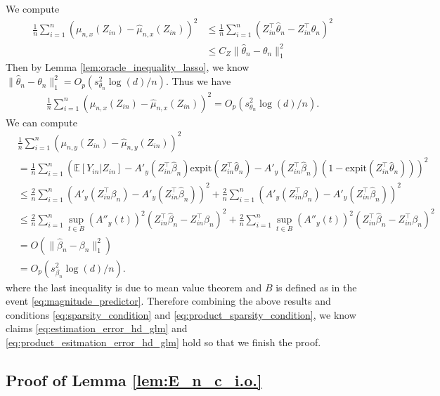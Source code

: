 \documentclass[12pt]{article}
\theoremstyle{definition}
\newcommand{\E}{\mathbb E}								%
\newcommand{\expit}{\mathrm{expit}}                 	%
\newcommand{\srz}{Z}									%
\newcommand{\sry}{Y}									%
\begin{document}
We compute 
\begin{align*}
  \frac{1}{n}\sum_{i=1}^n(\mu_{n,x}(\srz_{in})-\widehat{\mu}_{n,x}(\srz_{in}))^2
  &
  \leq \frac{1}{n}\sum_{i=1}^n(\srz_{in}^\top \hat\theta_n-\srz_{in}^\top\theta_n)^2\tag{Lipschitz property}\\
  &
  \leq C_Z\|\hat\theta_n-\theta_n\|_1^2\tag{H\"older's inequality}
\end{align*}
Then by Lemma \ref{lem:oracle_inequality_lasso}, we know $\|\hat\theta_n-\theta_n\|_1^2=O_p(s_{\theta_n}^2\log(d)/n)$. Thus we have 
\begin{align*}
  \frac{1}{n}\sum_{i=1}^n(\mu_{n,x}(\srz_{in})-\widehat{\mu}_{n,x}(\srz_{in}))^2=O_p(s_{\theta_n}^2\log(d)/n).
\end{align*}
We can compute 
\begin{align*}
  &
  \frac{1}{n}\sum_{i=1}^n(\mu_{n,y}(\srz_{in})-\widehat{\mu}_{n,y}(\srz_{in}))^2\\
  &
  =\frac{1}{n}\sum_{i=1}^n (\E[\sry_{in}|\srz_{in}]-A'_y(\srz_{in}^\top \widehat\beta_n)\expit(\srz_{in}^\top\widehat{\theta}_n)-A'_y(\srz_{in}^\top \widehat\beta_n)(1-\expit(\srz_{in}^\top\widehat{\theta}_n)))^2\\
  &
  \leq \frac{2}{n}\sum_{i=1}^n(A'_y(\srz_{in}^\top\beta_n)-A'_y(\srz_{in}^\top\widehat\beta_n))^2+\frac{2}{n}\sum_{i=1}^n(A'_y(\srz_{in}^\top\beta_n)-A'_y(\srz_{in}^\top\widehat\beta_n))^2\\
  &
  \leq \frac{2}{n}\sum_{i=1}^n \sup_{t\in B}(A''_y(t))^2(\srz_{in}^\top \widehat\beta_n-\srz_{in}^\top \beta_n)^2+\frac{2}{n}\sum_{i=1}^n \sup_{t\in B}(A''_y(t))^2(\srz_{in}^\top \widehat\beta_n-\srz_{in}^\top \beta_n)^2\\
  &
  =O(\|\widehat{\beta}_n-\beta_n\|_1^2)\\
  &
  =O_p(s_{\beta_n}^2\log(d)/n).
\end{align*}
where the last inequality is due to mean value theorem and $B$ is defined as in the event \eqref{eq:magnitude_predictor}. Therefore combining the above results and conditions \eqref{eq:sparsity_condition} and \eqref{eq:product_sparsity_condition}, we know claims \eqref{eq:estimation_error_hd_glm} and \eqref{eq:product_esitmation_error_hd_glm} hold so that we finish the proof.

\subsection{Proof of Lemma \ref{lem:E_n_c_i.o.}}\label{sec:proof_E_n_c_i.o.}
\end{document}
